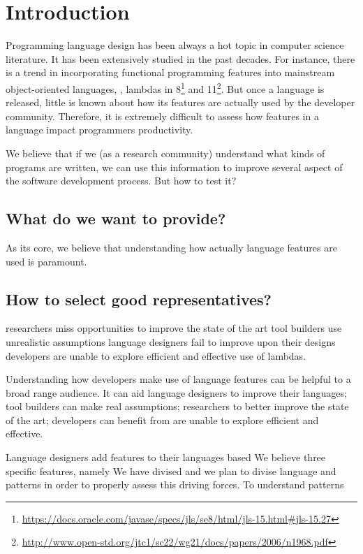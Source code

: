 

\chapter{Introduction}

Programming language design has been always a hot topic in computer science literature.
It has been extensively studied in the past decades.
For instance, there is a trend in incorporating functional programming features into mainstream object-oriented languages, \eg{}, lambdas in \java{} 8\footnote{\url{https://docs.oracle.com/javase/specs/jls/se8/html/jls-15.html\#jls-15.27}} and \cpp{}11\footnote{\url{http://www.open-std.org/jtc1/sc22/wg21/docs/papers/2006/n1968.pdf}}.
But once a language is released, little is known about how its features are actually used by the developer community.
Therefore, it is extremely difficult to assess how features in a language impact programmers productivity.

We believe that if we (as a research community) understand what kinds of programs are written, we can use this information to improve several aspect of the software development process.
But how to test it?

\section{What do we want to provide?}

As its core, we believe that understanding how actually language features are
used is paramount.


\section{How to select good representatives?}

researchers miss opportunities to improve the state of the art
tool builders use unrealistic assumptions
language designers fail to improve upon their designs
developers are unable to explore efficient and effective use of lambdas.

Understanding how developers make use of language features can be helpful to a broad range audience.
It can aid language designers to improve their languages;
tool builders can make real assumptions;
researchers to better improve the state of the art;
developers can benefit from are unable to explore efficient and effective.

Language designers add features to their languages based
We believe
three specific features, namely
We have divised and we plan to divise language and \api{} patterns in order to properly assess this driving forces.
To understand patterns

